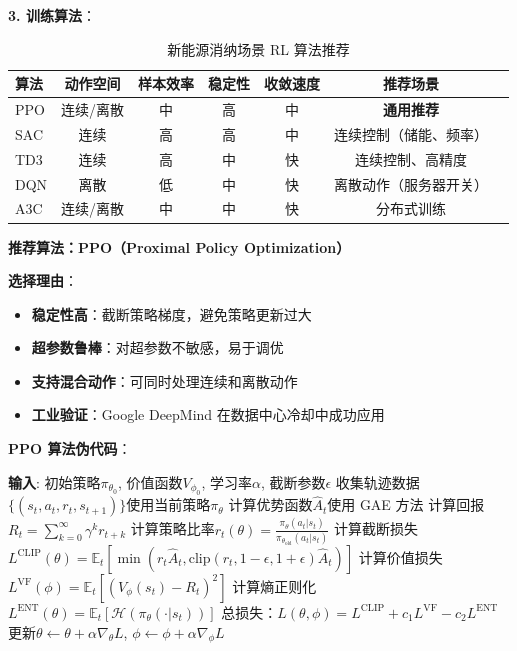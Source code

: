 \documentclass[12pt,a4paper]{article}
\begin{document}
\textbf{3. 训练算法}：

\begin{table}[h]
\centering
\caption{新能源消纳场景 RL 算法推荐}
\label{tab:rl-algo-recommend}
\begin{tabular}{@{}lcccccc@{}}
\toprule
\textbf{算法} & \textbf{动作空间} & \textbf{样本效率} & \textbf{稳定性} & \textbf{收敛速度} & \textbf{推荐场景} \\
\midrule
PPO & 连续/离散 & 中 & 高 & 中 & \textbf{通用推荐} \\
SAC & 连续 & 高 & 高 & 中 & 连续控制（储能、频率） \\
TD3 & 连续 & 高 & 中 & 快 & 连续控制、高精度 \\
DQN & 离散 & 低 & 中 & 快 & 离散动作（服务器开关） \\
A3C & 连续/离散 & 中 & 中 & 快 & 分布式训练 \\
\bottomrule
\end{tabular}
\end{table}

\textbf{推荐算法：PPO（Proximal Policy Optimization）}

\textbf{选择理由}：
\begin{itemize}
    \item \textbf{稳定性高}：截断策略梯度，避免策略更新过大
    \item \textbf{超参数鲁棒}：对超参数不敏感，易于调优
    \item \textbf{支持混合动作}：可同时处理连续和离散动作
    \item \textbf{工业验证}：Google DeepMind 在数据中心冷却中成功应用
\end{itemize}

\textbf{PPO 算法伪代码}：

\begin{algorithm}[h]
\caption{PPO for Compute-Power Co-Scheduling}
\label{alg:ppo}
\begin{algorithmic}[1]
\STATE \textbf{输入}: 初始策略$\pi_{\theta_0}$, 价值函数$V_{\phi_0}$, 学习率$\alpha$, 截断参数$\epsilon$
    \STATE 收集轨迹数据$\{(s_t, a_t, r_t, s_{t+1})\}$使用当前策略$\pi_{\theta}$
    \STATE 计算优势函数$\hat{A}_t$使用 GAE 方法
    \STATE 计算回报$R_t = \sum_{k=0}^{\infty} \gamma^k r_{t+k}$
        \STATE 计算策略比率$r_t(\theta) = \frac{\pi_{\theta}(a_t|s_t)}{\pi_{\theta_{\text{old}}}(a_t|s_t)}$
        \STATE 计算截断损失$L^{\text{CLIP}}(\theta) = \mathbb{E}_t[\min(r_t \hat{A}_t, \text{clip}(r_t, 1-\epsilon, 1+\epsilon) \hat{A}_t)]$
        \STATE 计算价值损失$L^{\text{VF}}(\phi) = \mathbb{E}_t[(V_{\phi}(s_t) - R_t)^2]$
        \STATE 计算熵正则化$L^{\text{ENT}}(\theta) = \mathbb{E}_t[\mathcal{H}(\pi_{\theta}(\cdot|s_t))]$
        \STATE 总损失：$L(\theta, \phi) = L^{\text{CLIP}} + c_1 L^{\text{VF}} - c_2 L^{\text{ENT}}$
        \STATE 更新$\theta \leftarrow \theta + \alpha \nabla_{\theta} L$, $\phi \leftarrow \phi + \alpha \nabla_{\phi} L$
    \ENDFOR
\ENDFOR
\end{algorithmic}
\end{algorithm}
\end{document}
